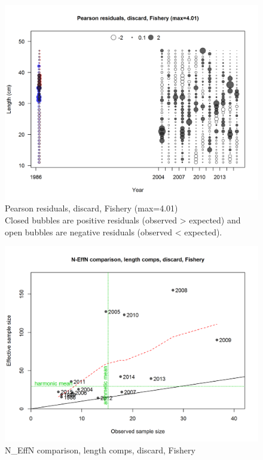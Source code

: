 \documentclass[12pt,]{article}
\begin{document}
\begin{figure}
\centering
\includegraphics{./r4ss/plots_mod1/comp_lenfit_residsflt1mkt1.png}
\caption{Pearson residuals, discard, Fishery (max=4.01)\\
Closed bubbles are positive residuals (observed \textgreater{} expected)
and open bubbles are negative residuals (observed \textless{} expected).
\label{fig:mod1_2_comp_lenfit_residsflt1mkt1}}
\end{figure}

\begin{figure}
\centering
\includegraphics{./r4ss/plots_mod1/comp_lenfit_sampsize_flt1mkt1.png}
\caption{N\_EffN comparison, length comps, discard, Fishery
\label{fig:mod1_3_comp_lenfit_sampsize_flt1mkt1}}
\end{figure}
\end{document}
